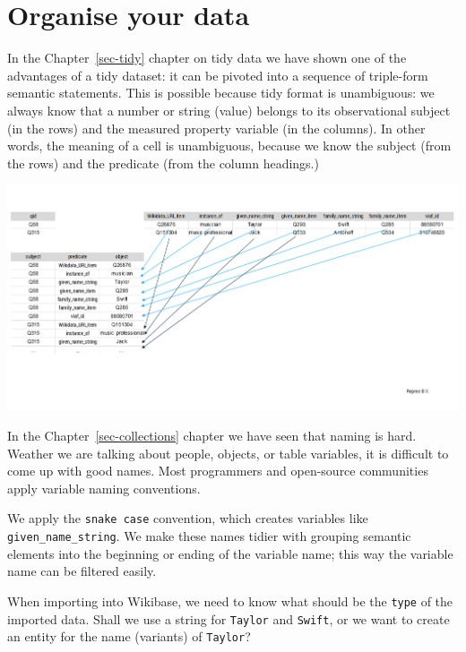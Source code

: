 \documentclass[
  letterpaper,
  DIV=11,
  numbers=noendperiod]{scrreprt}
\begin{document}
\section{Organise your data}\label{organise-your-data}

In the Chapter~\ref{sec-tidy} chapter on tidy data we have shown one of
the advantages of a tidy dataset: it can be pivoted into a sequence of
triple-form semantic statements. This is possible because tidy format is
unambiguous: we always know that a number or string (value) belongs to
its observational subject (in the rows) and the measured property
variable (in the columns). In other words, the meaning of a cell is
unambiguous, because we know the subject (from the rows) and the
predicate (from the column headings.)

\begin{center}
\includegraphics{png/tidy/pivot_longer_to_statements_notitle_2x1.png}
\end{center}

In the Chapter~\ref{sec-collections} chapter we have seen that naming is
hard. Weather we are talking about people, objects, or table variables,
it is difficult to come up with good names. Most programmers and
open-source communities apply variable naming conventions.

We apply the \texttt{snake\ case} convention, which creates variables
like \texttt{given\_name\_string}. We make these names tidier with
grouping semantic elements into the beginning or ending of the variable
name; this way the variable name can be filtered easily.

When importing into Wikibase, we need to know what should be the
\texttt{type} of the imported data. Shall we use a string for
\texttt{Taylor} and \texttt{Swift}, or we want to create an entity for
the name (variants) of \texttt{Taylor}?
\end{document}
